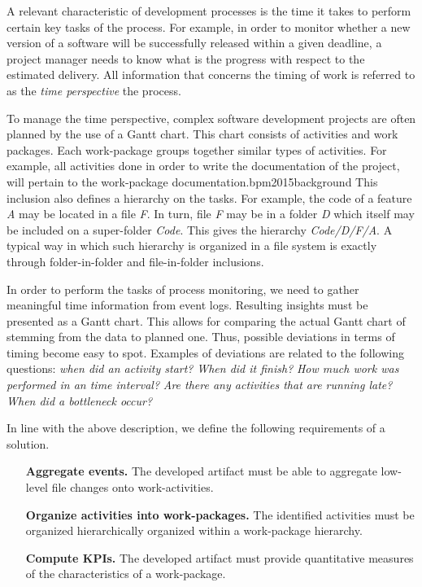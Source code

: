 

A relevant characteristic of development processes is the time it takes to perform certain key tasks of the process. For example, in order to monitor whether a new version of a software will be successfully released within a given deadline, a project manager needs to know what is the progress with respect to the estimated delivery. All information that concerns the timing of work is referred to as the \emph{time perspective} the process. 
 

To manage the time perspective, complex software development projects are often planned by the use of a Gantt chart. This chart consists of activities and work packages. Each work-package groups together similar types of activities. For example, all activities done in order to write the documentation of the project, will pertain to the work-package documentation.bpm2015background This inclusion also defines a hierarchy on the tasks. For example, the code of a feature \emph{A} may be located in a file \emph{F}. In turn, file \emph{F} may be in a folder \emph{D} which itself may be included on a super-folder \emph{Code}. This gives the hierarchy \emph{Code/D/F/A}. A typical way in which such hierarchy is organized in a file system is exactly through folder-in-folder and file-in-folder inclusions. 

In order to perform the tasks of process monitoring, we need to gather meaningful time information from event logs. Resulting insights must be presented as a Gantt chart. This allows for comparing the actual Gantt chart of stemming from the data to planned one. Thus, possible deviations in terms of timing become easy to spot. Examples of deviations are related to the following questions: \emph{when did an activity start?} \emph{When did it finish?} \emph{How much work was performed in an time interval?} \emph{Are there any activities that are running late?} \emph{When did a bottleneck occur?} 

In line with the above description, we define the following requirements of a solution. 
\begin{itemize}
	\item[\textbf{Aggregate events.}] The developed artifact must be able to aggregate low-level file changes onto work-activities. 
	\item[\textbf{Organize activities into work-packages.}] The identified activities must be organized hierarchically organized within a work-package hierarchy. 
	\item[\textbf{Compute KPIs.}] The developed artifact must provide quantitative measures of the characteristics of a work-package.
\end{itemize}

